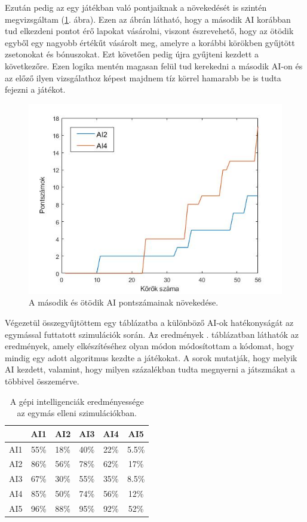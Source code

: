 Ezután pedig az egy játékban való pontjaiknak a növekedését is szintén megvizsgáltam (\ref{fig:player_scores2v5}. ábra). Ezen az ábrán látható, hogy a második AI korábban tud elkezdeni pontot érő lapokat vásárolni, viszont észrevehető, hogy az ötödik egyből egy nagyobb értékűt vásárolt meg, amelyre a korábbi körökben gyűjtött zsetonokat és bónuszokat. Ezt követően pedig újra gyűjteni kezdett a következőre. Ezen logika mentén magasan felül tud kerekedni a második AI-on és az előző ilyen vizsgálathoz képest majdnem tíz körrel hamarabb be is tudta fejezni a játékot.

\begin{figure}[h]
\centering
\includegraphics[scale=0.5]{images/player_points_AI2vsAI5.jpg}
\caption{A második és ötödik AI pontszámainak növekedése.}
\label{fig:player_scores2v5}
\end{figure}



Végezetül összegyűjtöttem egy táblázatba a különböző AI-ok hatékonyságát az egymással futtatott szimulációk során. Az eredmények . táblázatban láthatók az eredmények, amely elkészítéséhez olyan módon módosítottam a kódomat, hogy mindig egy adott algoritmus kezdte a játékokat. A sorok mutatják, hogy melyik AI kezdett, valamint, hogy milyen százalékban tudta megnyerni a játszmákat a többivel összemérve.

\begin{table}[h]
\caption{A gépi intelligenciák eredményessége az egymás elleni szimulációkban.}
\label{tab:ai_comparison}
\medskip
\centering
\begin{tabular}{|c|c|c|c|c|c|} 
 \hline
  & AI1 & AI2 & AI3 & AI4 & AI5 \\ 
 \hline
 AI1 & 55\% & 18\% & 40\% & 22\% & 5.5\%\\ 
 \hline
 AI2 & 86\% & 56\% & 78\% & 62\% & 17\%\\ 
 \hline
 AI3 & 67\% & 30\% & 55\% & 35\% & 8.5\%\\ 
 \hline
 AI4 & 85\% & 50\% & 74\% & 56\% & 12\%\\ 
 \hline
 AI5 & 96\% & 88\% & 95\% & 92\% & 52\%\\
 \hline
\end{tabular}
\end{table}

